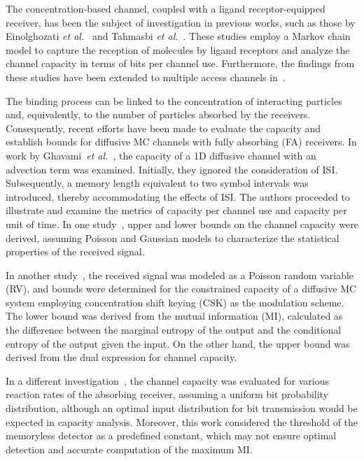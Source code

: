 \documentclass[journal]{IEEEtranTCOM}
\begin{document}
The concentration-based channel, coupled with a ligand receptor-equipped receiver, has been the subject of investigation in previous works, such as those by Einolghozati \textit{et al.}~\cite{einolghozati2011capacity} and Tahmasbi \textit{et al.}~\cite{tahmasbi2015capacity}. These studies employ a Markov chain model to capture the reception of molecules by ligand receptors and analyze the channel capacity in terms of bits per channel use. Furthermore, the findings from these studies have been extended to multiple access channels in~\cite{aminian2015capacity}.

The binding process can be linked to the concentration of interacting particles and, equivalently, to the number of particles absorbed by the receivers. Consequently, recent efforts have been made to evaluate the capacity and establish bounds for diffusive MC channels with fully absorbing (FA) receivers. In work by Ghavami~\textit{et al.}~\cite{ghavami2015information}, the capacity of a 1D diffusive channel with an advection term was examined. Initially, they ignored the consideration of ISI. Subsequently, a memory length equivalent to two symbol intervals was introduced, thereby accommodating the effects of ISI. The authors proceeded to illustrate and examine the metrics of capacity per channel use and capacity per unit of time. In one study~\cite{ratti2020upper}, upper and lower bounds on the channel capacity were derived, assuming Poisson and Gaussian models to characterize the statistical properties of the received signal.

In another study~\cite{ratti2021bounds}, the received signal was modeled as a Poisson random variable (RV), and bounds were determined for the constrained capacity of a diffusive MC system employing concentration shift keying (CSK) as the modulation scheme. The lower bound was derived from the mutual information (MI), calculated as the difference between the marginal entropy of the output and the conditional entropy of the output given the input. On the other hand, the upper bound was derived from the dual expression for channel capacity.

In a different investigation~\cite{liu2020channel}, the channel capacity was evaluated for various reaction rates of the absorbing receiver, assuming a uniform bit probability distribution, although an optimal input distribution for bit transmission would be expected in capacity analysis. Moreover, this work considered the threshold of the memoryless detector as a predefined constant, which may not ensure optimal detection and accurate computation of the maximum MI.
\end{document}
